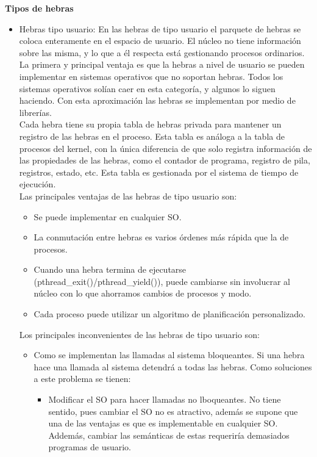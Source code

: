 \documentclass{article}
\begin{document}
\textbf{Tipos de hebras}
\begin{itemize}
\item Hebras tipo usuario: En las hebras de tipo usuario el parquete de hebras se coloca enteramente en el espacio de usuario. El núcleo no tiene información sobre las misma, y lo que a él respecta está gestionando procesos ordinarios. La primera y principal ventaja es que la hebras a nivel de usuario se pueden implementar en sistemas operativos que no soportan hebras. Todos los sistemas operativos solían caer en esta categoría, y algunos lo siguen haciendo. Con esta aproximación las hebras se implementan por medio de librerías.\\

Cada hebra tiene su propia tabla de hebras privada para mantener un registro de las hebras en el proceso. Esta tabla es análoga a la tabla de procesos del kernel, con la única diferencia de que solo registra información de las propiedades de las hebras, como el contador de programa, registro de pila, registros, estado, etc. Esta tabla es gestionada por el sistema de tiempo de ejecución.\\

Las principales ventajas de las hebras de tipo usuario son:
	\begin{itemize}
	\item Se puede implementar en cualquier SO.
	
	\item La conmutación entre hebras es varios órdenes más rápida que la de procesos.
	
	\item Cuando una hebra termina de ejecutarse (pthread\_exit()/pthread\_yield()), puede cambiarse sin involucrar al núcleo con lo que ahorramos cambios de procesos y modo.
	
	\item Cada proceso puede utilizar un algoritmo de planificación personalizado.
	\end{itemize}

Los principales inconvenientes de las hebras de tipo usuario son:
	\begin{itemize}
	\item Como se implementan las llamadas al sistema bloqueantes. Si una hebra hace una llamada al sistema detendrá a todas las hebras. Como soluciones a este problema se tienen:
		\begin{itemize}
		\item Modificar el SO para hacer llamadas no lboqueantes. No tiene sentido, pues cambiar el SO no es atractivo, además se supone que una de las ventajas es que es implementable en cualquier SO. Addemás, cambiar las semánticas de estas requeriría demasiados programas de usuario.
		

\end{itemize}
\end{itemize}
\end{itemize}
\end{document}
